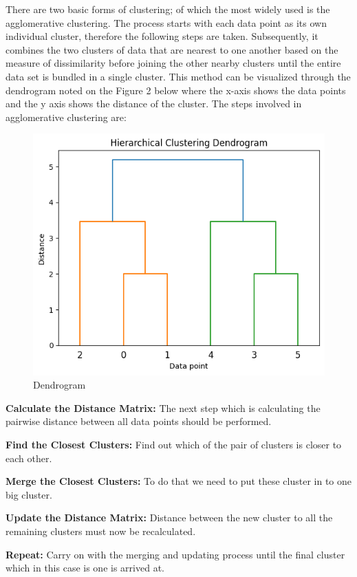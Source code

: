 \documentclass[conference]{IEEEtran}
\begin{document}
There are two basic forms of clustering; of which the most widely used is the agglomerative clustering. The process starts with each data point as its own individual cluster, therefore the following steps are taken. Subsequently, it combines the two clusters of data that are nearest to one another based on the measure of dissimilarity before joining the other nearby clusters until the entire data set is bundled in a single cluster. This method can be visualized through the dendrogram noted on the Figure 2 below where the x-axis shows the data points and the y axis shows the distance of the cluster.\cite{nielsen2016introduction} The steps involved in agglomerative clustering are:

\begin{figure}
    \centering
    \includegraphics[width=0.7\linewidth]{Dendrogram.png}
    \caption{Dendrogram\cite{Dendrogram}}
    \label{fig:enter-label}
\end{figure}

\textbf{Calculate the Distance Matrix: }The next step which is calculating the pairwise distance between all data points should be performed.

\textbf{Find the Closest Clusters:} Find out which of the pair of clusters is closer to each other.

\textbf{Merge the Closest Clusters:} To do that we need to put these cluster in to one big cluster.

\textbf{Update the Distance Matrix:} Distance between the new cluster to all the remaining clusters must now be recalculated.

\textbf{Repeat:} Carry on with the merging and updating process until the final cluster which in this case is one is arrived at.
\end{document}
